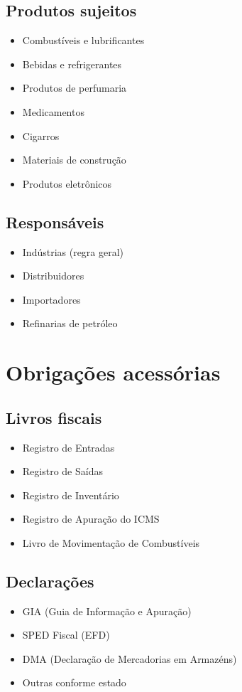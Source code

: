 \documentclass[12pt,a4paper]{article}
\begin{document}
\subsection{Produtos sujeitos}
\begin{itemize}
    \item Combustíveis e lubrificantes
    \item Bebidas e refrigerantes
    \item Produtos de perfumaria
    \item Medicamentos
    \item Cigarros
    \item Materiais de construção
    \item Produtos eletrônicos
\end{itemize}

\subsection{Responsáveis}
\begin{itemize}
    \item Indústrias (regra geral)
    \item Distribuidores
    \item Importadores
    \item Refinarias de petróleo
\end{itemize}

\section{Obrigações acessórias}

\subsection{Livros fiscais}
\begin{itemize}
    \item Registro de Entradas
    \item Registro de Saídas
    \item Registro de Inventário
    \item Registro de Apuração do ICMS
    \item Livro de Movimentação de Combustíveis
\end{itemize}

\subsection{Declarações}
\begin{itemize}
    \item GIA (Guia de Informação e Apuração)
    \item SPED Fiscal (EFD)
    \item DMA (Declaração de Mercadorias em Armazéns)
    \item Outras conforme estado
\end{itemize}
\end{document}
